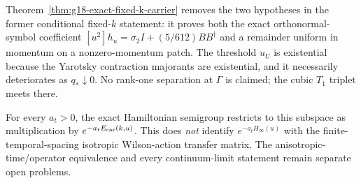 \begin{remark}
\label{rem:g18-internal-sheet-firewall}
Theorem~\ref{thm:g18-exact-fixed-k-carrier} removes the two hypotheses in the
former conditional fixed-$k$ statement: it proves both the exact
orthonormal-symbol coefficient
$[u^2]h_u=\sigma_2I+(5/612)BB^\dagger$ and a remainder uniform in momentum
on a nonzero-momentum patch.  The threshold $u_U$ is
existential because the Yarotsky contraction majorants are existential, and
it necessarily deteriorates as $q_*\downarrow0$.  No rank-one separation at
$\Gamma$ is claimed; the cubic $T_1$ triplet meets there.

For every $a_t>0$, the exact Hamiltonian semigroup restricts to this subspace
as multiplication by $e^{-a_tE_{\rm car}(k,u)}$.  This does \emph{not}
identify $e^{-a_tH_\infty(u)}$ with the finite-temporal-spacing isotropic
Wilson-action transfer matrix.  The anisotropic-time/operator equivalence and
every continuum-limit statement remain separate open problems.
\end{remark}
